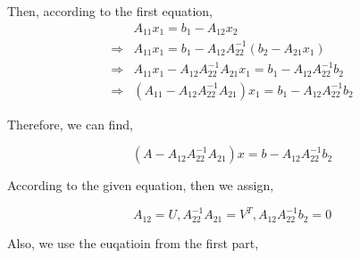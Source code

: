 \documentclass{article}
\def\implies{\Longrightarrow}
\begin{document}
Then, according to the first equation,
\[
\begin{split}
 & A_{11}x_1 = b_1 - A_{12}x_2 \\
 \implies & A_{11}x_1  = b_1 - A_{12}A_{22}^{-1}(b_2 - A_{21}x_1) \\
 \implies & A_{11}x_1 - A_{12}A_{22}^{-1}A_{21}x_1 =b_1 - A_{12}A_{22}^{-1}b_2 \\
 \implies & (A_{11} - A_{12}A_{22}^{-1}A_{21})x_1 = b_1 -  A_{12}A_{22}^{-1}b_2 
\end{split}
\]


Therefore, we can find,

$$(A - A_{12}A_{22}^{-1}A_{21})x = b -  A_{12}A_{22}^{-1}b_2 $$

According to the given equation, then we assign,

$$A_{12} = U, A_{22}^{-1}A_{21} = V^T, A_{12}A_{22}^{-1}b_2 = 0$$

Also, we use the euqatioin from the first part,
\end{document}
